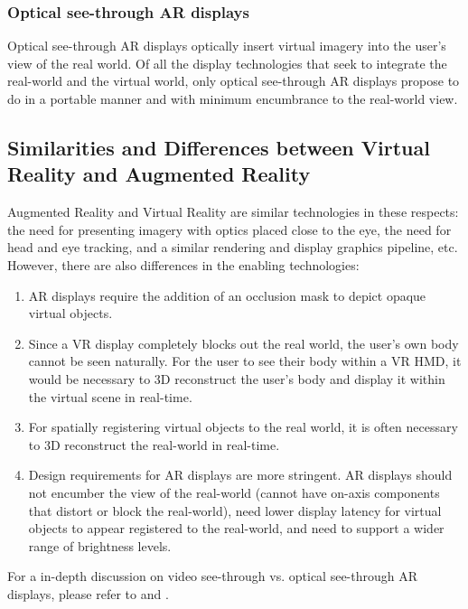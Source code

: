 \subsubsection{Optical see-through AR displays}
\label{sec:background:ost_displays}
Optical see-through AR displays optically insert virtual imagery into the user’s view of the real world. 
Of all the display technologies that seek to integrate the real-world and the virtual world, only optical see-through AR displays propose to do in a portable manner and with minimum encumbrance to the real-world view.

\subsection{Similarities and Differences between Virtual Reality and Augmented Reality}
\label{sec:background:ar_vs_vr_displays}

Augmented Reality and Virtual Reality are similar technologies in these respects: the need for presenting imagery with optics placed close to the eye, the need for head and eye tracking, and a similar rendering and display graphics pipeline, etc. 
However, there are also differences in the enabling technologies:

\begin{enumerate}
    \item AR displays require the addition of an occlusion mask to depict opaque virtual objects. 
    \item Since a VR display completely blocks out the real world, the user’s own body cannot be seen naturally. For the user to see their body within a VR HMD, it would be necessary to 3D reconstruct the user’s body and display it within the virtual scene in real-time.
    \item For spatially registering virtual objects to the real world, it is often necessary to 3D reconstruct the real-world in real-time.
    \item Design requirements for AR displays are more stringent. AR displays should not encumber the view of the real-world (cannot have on-axis components that distort or block the real-world), need lower display latency for virtual objects to appear registered to the real-world, and need to support a wider range of brightness levels. 
\end{enumerate}
For a in-depth discussion on video see-through vs. optical see-through AR displays, please refer to \citet{Rolland2000} and \citet{rolland1995comparison}. 

